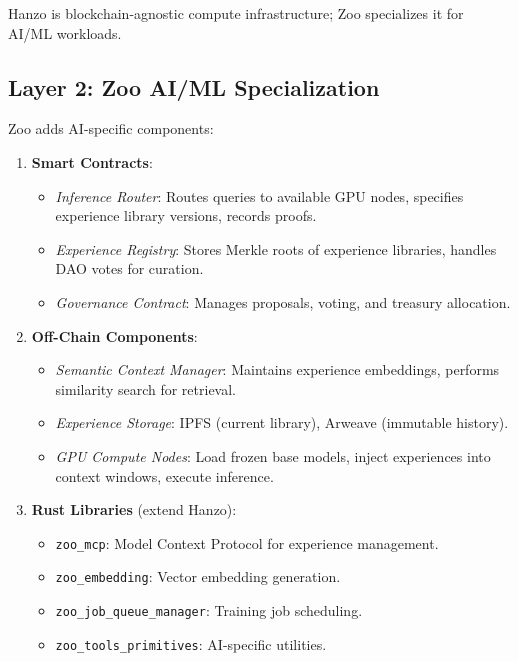 Hanzo is blockchain-agnostic compute infrastructure; Zoo specializes it for AI/ML workloads.

\subsection{Layer 2: Zoo AI/ML Specialization}

Zoo adds AI-specific components:

\begin{enumerate}[leftmargin=*]
\item \textbf{Smart Contracts}:
   \begin{itemize}
   \item \textit{Inference Router}: Routes queries to available GPU nodes, specifies experience library versions, records proofs.
   \item \textit{Experience Registry}: Stores Merkle roots of experience libraries, handles DAO votes for curation.
   \item \textit{Governance Contract}: Manages proposals, voting, and treasury allocation.
   \end{itemize}

\item \textbf{Off-Chain Components}:
   \begin{itemize}
   \item \textit{Semantic Context Manager}: Maintains experience embeddings, performs similarity search for retrieval.
   \item \textit{Experience Storage}: IPFS (current library), Arweave (immutable history).
   \item \textit{GPU Compute Nodes}: Load frozen base models, inject experiences into context windows, execute inference.
   \end{itemize}

\item \textbf{Rust Libraries} (extend Hanzo):
   \begin{itemize}
   \item \texttt{zoo\_mcp}: Model Context Protocol for experience management.
   \item \texttt{zoo\_embedding}: Vector embedding generation.
   \item \texttt{zoo\_job\_queue\_manager}: Training job scheduling.
   \item \texttt{zoo\_tools\_primitives}: AI-specific utilities.
   \end{itemize}
\end{enumerate}

